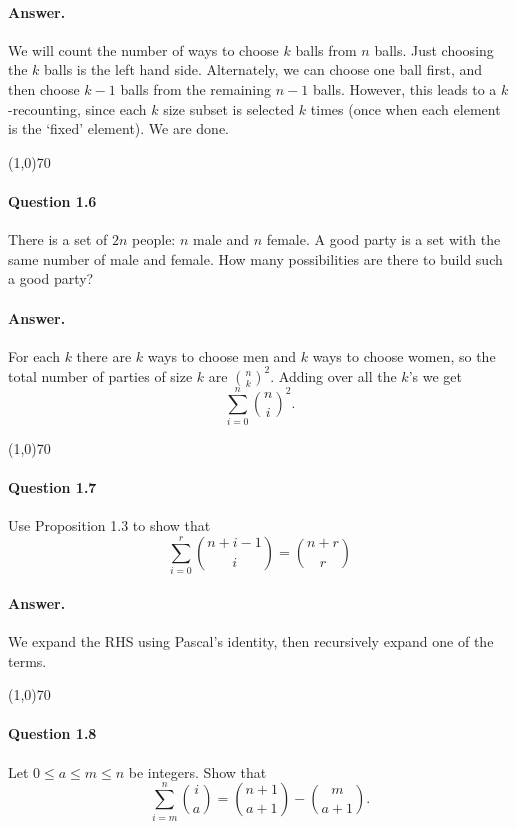 \paragraph{Answer.} We will count the number of ways to choose $k$ balls from $n$ balls. Just choosing the $k$ balls is the left hand side. Alternately, we can choose one ball first, and then choose $k-1$ balls from the remaining $n-1$ balls. However, this leads to a $k$-recounting, since each $k$ size subset is selected $k$ times (once when each element is the `fixed' element). We are done.

\begin{center}
	\line(1,0){70}
\end{center}

\paragraph{Question 1.6} There is a set of $2n$ people: $n$ male and $n$ female. A good party is a set with the same number of male and female. How many possibilities are there to build such a good party?

\paragraph{Answer.} For each $k$ there are $k$ ways to choose men and $k$ ways to choose women, so the total number of parties of size $k$ are $\binom{n}{k}^2$. Adding over all the $k$'s we get
$$\sum_{i=0}^{n}\binom{n}{i}^2.$$

\begin{center}
	\line(1,0){70}
\end{center}

\paragraph{Question 1.7}
Use Proposition 1.3 to show that
$$\sum_{i=0}^r\binom{n+i-1}{i}=\binom{n+r}{r}$$

\paragraph{Answer.} We expand the RHS using Pascal's identity, then recursively expand one of the terms.

\begin{center}
	\line(1,0){70}
\end{center}

\paragraph{Question 1.8} Let $0\leq a\leq m\leq n$ be integers. Show that
$$\sum_{i=m}^n\binom{i}{a}=\binom{n+1}{a+1}-\binom{m}{a+1}.$$

